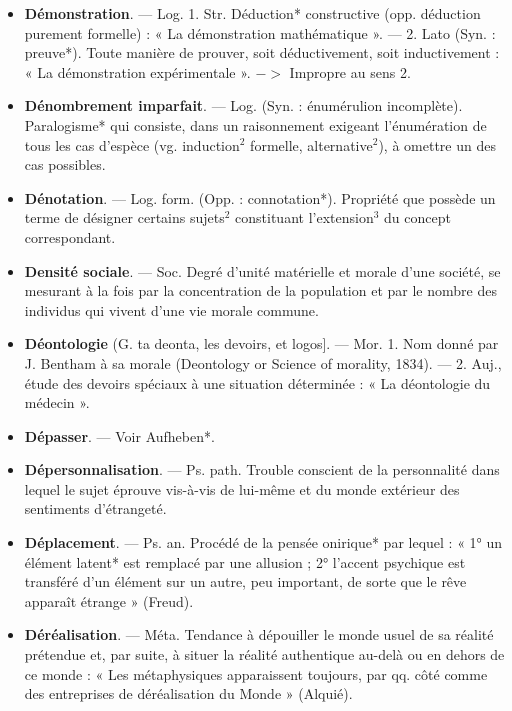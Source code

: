 \begin{itemize}[leftmargin=1cm, label=, itemsep=1pt]
\item {\bf Démonstration}. — Log. 1. Str. Déduction* constructive (opp. déduction
purement formelle) : « La démonstration mathématique ». — 2. Lato
(Syn. : preuve*). Toute manière de
prouver, soit déductivement, soit
inductivement : « La démonstration
expérimentale ». $->$ Impropre au
sens 2.

\item {\bf Dénombrement imparfait}. — Log.
(Syn. : énumérulion incomplète).
Paralogisme* qui consiste, dans un
raisonnement exigeant l’énumération de tous les cas d'espèce (vg.
induction$^2$ formelle, alternative$^2$), à
omettre un des cas possibles.

\item {\bf Dénotation}. — Log. form. (Opp. : connotation*). Propriété que possède un
terme de désigner certains sujets$^2$
constituant l'extension$^3$ du concept
correspondant.

\item {\bf Densité sociale}. — Soc. Degré d'unité
matérielle et morale d’une société,
se mesurant à la fois par la concentration de la population et par le
nombre des individus qui vivent
d’une vie morale commune.

\item {\bf Déontologie} (G. ta deonta, les devoirs,
et logos]. — Mor. 1. Nom donné par
J. Bentham à sa morale (Deontology
or Science of morality, 1834). —
2. Auj., étude des devoirs spéciaux
à une situation déterminée : « La
déontologie du médecin ».

\item {\bf Dépasser}. — Voir Aufheben*.

\item {\bf Dépersonnalisation}. — Ps. path.
Trouble conscient de la personnalité
dans lequel le sujet éprouve vis-à-vis
de lui-même et du monde extérieur
des sentiments d’étrangeté.

\item {\bf Déplacement}. — Ps. an. Procédé de la
pensée onirique* par lequel : « 1° un
élément latent* est remplacé par
une allusion ; 2° l'accent psychique
est transféré d’un élément sur un
autre, peu important, de sorte que
le rêve apparaît étrange » (Freud).

\item {\bf Déréalisation}. — Méta. Tendance à
dépouiller le monde usuel de sa
réalité prétendue et, par suite, à
situer la réalité authentique au-delà ou en dehors de ce monde :
« Les métaphysiques apparaissent
toujours, par qq. côté comme des
entreprises de déréalisation du
Monde » (Alquié).


\end{itemize}

